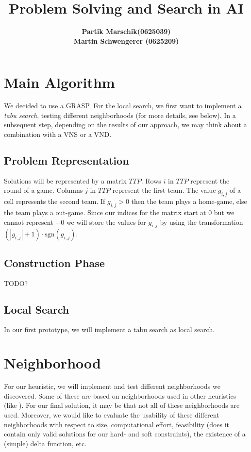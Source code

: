 \documentclass[a4paper,11pt]{article}
\title{ \LARGE \bf Problem Solving and Search in AI }
\author{
\bf Partik Marschik(0625039) \\
\bf Martin Schwengerer (0625209) }
\begin{document}
\maketitle

\section{Main Algorithm}
We decided to use a \ac{GRASP}. For the local search, we first want to implement a \emph{tabu search}, testing different neighborhoods (for more details, see below). In a subsequent step, depending on the results of our approach, we may think about a combination with a \ac{VNS} or a \ac{VND}.



\subsection{Problem Representation}
Solutions will be represented by a matrix $TTP$.
Rows $i$ in $TTP$ represent the round of a game.
Columns $j$ in $TTP$ represent the first team.
The value $g_{i,j}$ of a cell represents the second team.
If $g_{i,j} > 0$ then the team plays a home-game, else the team plays a out-game.
Since our indices for the matrix start at $0$ but we cannot represent $-0$ we will
store the values for $g_{i,j}$ by using the transformation
$(|g_{i,j}| + 1) \cdot \text{sgn}(g_{i,j})$.

\subsection{Construction Phase}
TODO?
\subsection{Local Search}
In our first prototype, we will implement a tabu search as local search.

\section{Neighborhood}
For our heuristic, we will implement and test different neighborhoods we discovered. Some of these are based on neighborhoods used in other heuristics (like \cite{Gaspero07,rvk2008}).
For our final solution, it may be that not all of these neighborhoods are used. Moreover, we would like to evaluate the usability of these different neighborhoods with respect to size, computational effort, feasibility (does it contain only valid solutions for our hard- and soft constraints), the existence of a (simple) delta function, etc.
\end{document}

